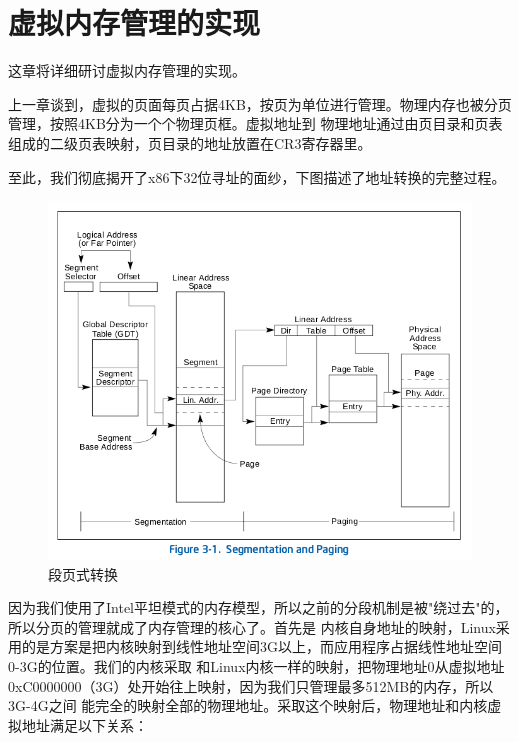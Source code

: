 
\section {虚拟内存管理的实现}

\par 这章将详细研讨虚拟内存管理的实现。

\par 上一章谈到，虚拟的页面每页占据4KB，按页为单位进行管理。物理内存也被分页管理，按照4KB分为一个个物理页框。虚拟地址到\allowbreak
物理地址通过由页目录和页表组成的二级页表映射，页目录的地址放置在CR3寄存器里。

\par 至此，我们彻底揭开了x86下32位寻址的面纱，下图描述了地址转换的完整过程。

\begin{figure}[H]
      \centering
      \includegraphics[scale=0.6]{picture/chapt10/ADDR_TRAN.png}
      \caption{段页式转换}
\end{figure}

\par 因为我们使用了Intel平坦模式的内存模型，所以之前的分段机制是被"绕过去"的，所以分页的管理就成了内存管理的核心了。首先是\allowbreak
内核自身地址的映射，Linux采用的是方案是把内核映射到线性地址空间3G以上，而应用程序占据线性地址空间0-3G的位置。我们的内核采取\allowbreak
和Linux内核一样的映射，把物理地址0从虚拟地址0xC0000000（3G）处开始往上映射，因为我们只管理最多512MB的内存，所以3G-4G之间\allowbreak
能完全的映射全部的物理地址。采取这个映射后，物理地址和内核虚拟地址满足以下关系：

